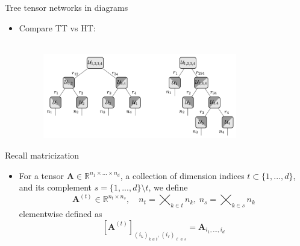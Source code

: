 \documentclass{beamer}
\newcommand{\bvec}[1]{\mathbf{#1}}
\newcommand{\vA}{\bvec{A}}
\newcommand{\bitem}{\item[$\bullet$]}
\begin{document}
\begin{frame}{Tree tensor networks in diagrams}

\begin{itemize}
    \bitem Compare TT vs HT:\\
    ~\\
    \begin{figure}
        \centering
        \includegraphics[width = 0.8\textwidth]{Graphics/TuckerVSTT.png}
    \end{figure}
\end{itemize}
    
\end{frame}





\begin{frame}{Recall matricization}

\begin{itemize}
    \bitem For a tensor $\vA \in\mathbb{R}^{n_1\times ... \times n_d}$, a collection of dimension indices $t \subset \{1,...,d\}$, and its complement $s = \{1,...,d\} \setminus t$, we define
    $$
    \vA^{(t)} \in\mathbb{R}^{n_t \times n_s},\quad 
    n_t = \bigtimes_{k \in t}n_k,~n_s = \bigtimes_{k \in s}n_k
    $$
    elementwise defined as
    $$
    [\vA^{(t)}]_{(i_k)_{k\in t},(i_\ell)_{\ell \in s}}
    =
    \vA_{i_1,...,i_d}
    $$
\end{itemize}
    
\end{frame}
\end{document}
